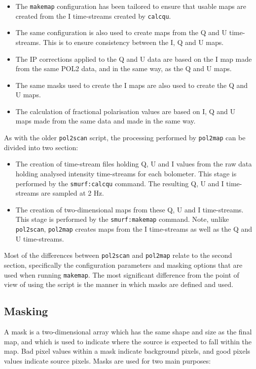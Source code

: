 \documentclass[twoside,11pt]{starlink}
\begin{document}
\begin{itemize}
\item The \texttt{makemap} configuration has been tailored to ensure that
usable maps are created from the I time-streams created by \texttt{calcqu}.
\item The same configuration is also used to create maps from the Q and U
time-streams. This is to ensure consistency between the I, Q and U maps.
\item The IP corrections applied to the Q and U data are based on the I
map made from the same POL2 data, and in the same way, as the Q and U maps.
\item The same masks used to create the I maps are also used to create
the Q and U maps.
\item The calculation of fractional polarisation values are based on I, Q
and U maps made from the same data and made in the same way.
\end{itemize}

As with the older \texttt{pol2scan} script, the processing performed by
\texttt{pol2map} can be divided into two section:

\begin{itemize}
\item The creation of time-stream files holding Q, U and I values from
the raw data holding analysed intensity time-streams for each bolometer.
This stage is performed by the \texttt{smurf:calcqu} command. The
resulting Q, U and I time-streams are sampled at 2 Hz.
\item The creation of two-dimensional maps from these Q, U and I
time-streams. This stage is performed by the \texttt{smurf:makemap} command.
Note, unlike \texttt{pol2scan}, \texttt{pol2map} creates maps from the I
time-streams as well as the Q and U time-streams.
\end{itemize}

Most of the differences between \texttt{pol2scan} and \texttt{pol2map}
relate to the second section, specifically the configuration parameters
and masking options that are used when running \texttt{makemap}. The most
significant difference from the point of view of using the script is the manner
in which masks are defined and used.

\subsection{Masking}
A mask is a two-dimensional array which has the same shape and size as
the final map, and which is used to indicate where the source is expected
to fall within the map. Bad pixel values within a mask indicate
background pixels, and good pixels values indicate source pixels. Masks
are used for two main purposes:
\end{document}
